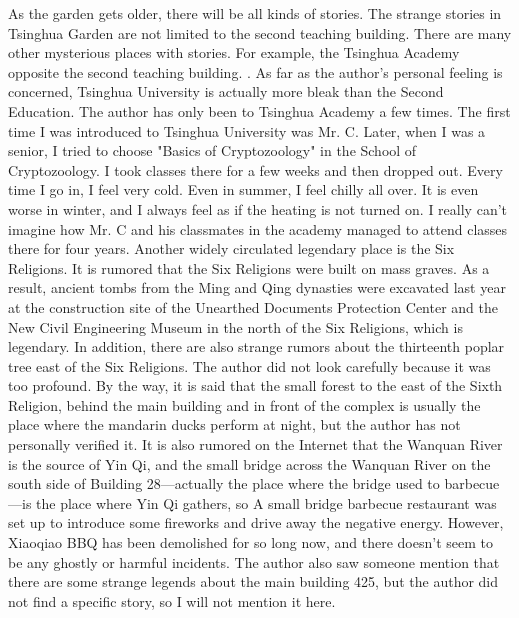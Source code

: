 As the garden gets older, there will be all kinds of stories. The strange
stories in Tsinghua Garden are not limited to the second teaching building.
There are many other mysterious places with stories. For example, the Tsinghua
Academy opposite the second teaching building. .  As far as the author's
personal feeling is concerned, Tsinghua University is actually more bleak than
the Second Education. The author has only been to Tsinghua Academy a few times.
The first time I was introduced to Tsinghua University was Mr. C. Later, when I
was a senior, I tried to choose "Basics of Cryptozoology" in the School of
Cryptozoology. I took classes there for a few weeks and then dropped out. Every
time I go in, I feel very cold. Even in summer, I feel chilly all over. It is
even worse in winter, and I always feel as if the heating is not turned on. I
really can’t imagine how Mr. C and his classmates in the academy managed to
attend classes there for four years.  Another widely circulated legendary place
is the Six Religions. It is rumored that the Six Religions were built on mass
graves. As a result, ancient tombs from the Ming and Qing dynasties were
excavated last year at the construction site of the Unearthed Documents
Protection Center and the New Civil Engineering Museum in the north of the Six
Religions, which is legendary.  In addition, there are also strange rumors
about the thirteenth poplar tree east of the Six Religions. The author did not
look carefully because it was too profound.  By the way, it is said that the
small forest to the east of the Sixth Religion, behind the main building and in
front of the complex is usually the place where the mandarin ducks perform at
night, but the author has not personally verified it.  It is also rumored on
the Internet that the Wanquan River is the source of Yin Qi, and the small
bridge across the Wanquan River on the south side of Building 28—actually the
place where the bridge used to barbecue—is the place where Yin Qi gathers, so A
small bridge barbecue restaurant was set up to introduce some fireworks and
drive away the negative energy.  However, Xiaoqiao BBQ has been demolished for
so long now, and there doesn't seem to be any ghostly or harmful incidents.
The author also saw someone mention that there are some strange legends about
the main building 425, but the author did not find a specific story, so I will
not mention it here.

\nocite{ClassroomBuilding2_Leg1,ClassroomBuilding2_Leg2,ClassroomBuilding2_Info1_THU,ClassroomBuilding2_Info2_Wikipedia,ClassroomBuilding2_Anal1,ClassroomBuilding6_Leg1,WanquanRiver_Leg1}
\putbib
